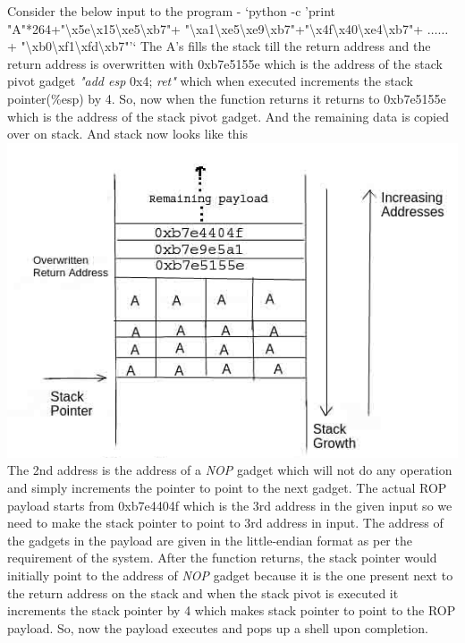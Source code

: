 \documentclass{article}
\begin{document}
\begin{multicols}{2}
	Consider the below input to the program - \break
	`python -c 'print "A"*264+"\textbackslash x5e\textbackslash x15\textbackslash xe5\textbackslash xb7"+ "\textbackslash xa1\textbackslash xe5\textbackslash xe9\textbackslash xb7"+"\textbackslash x4f\textbackslash x40\textbackslash xe4\textbackslash xb7"+ $\ldots\ldots$ + "\textbackslash xb0\textbackslash xf1\textbackslash xfd\textbackslash xb7"'` \break
	The A's fills the stack till the return address and the return address is overwritten with 0xb7e5155e which is the address of the stack pivot gadget \textit{"add esp} 0x4;\textit{ ret"} which when executed increments the stack pointer(\%esp) by 4. So, now when the function returns it returns to 0xb7e5155e which is the address of the stack pivot gadget. And the remaining data is copied over on stack. And stack now looks like this
	\includegraphics[scale=.4]{ex_prog.jpg}
	 The 2nd address is the address of a \textit{NOP} gadget which will not do any operation and simply increments the pointer to point to the next gadget. The actual ROP payload starts from 0xb7e4404f which is the 3rd address in the given input so we need to make the stack pointer to point to 3rd address in input. The address of the gadgets in the payload are given in the little-endian format as per the requirement of the system. After the function returns, the stack pointer would initially point to the address of \textit{NOP} gadget because it is the one present next to the return address on the stack and when the stack pivot is executed it increments the stack pointer by 4 which makes stack pointer to point to the ROP payload. So, now the payload executes and pops up a shell upon completion.
	

\end{multicols}
\end{document}
